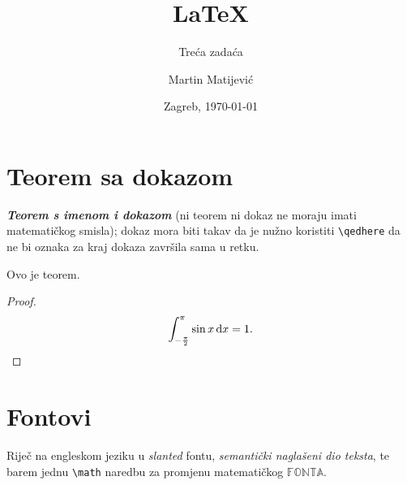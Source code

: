 \documentclass[12pt]{scrartcl}
\newcommand{\BI}[1]{\textbf{\textit{#1}}}
\begin{document}
\title{\Huge\LaTeX}
\subtitle{Treća zadaća}
\author{Martin Matijević}
\date{Zagreb, \today}
\maketitle
\tableofcontents

\section{Teorem sa dokazom}
\BI{Teorem s imenom i dokazom} (ni teorem ni dokaz ne moraju imati matematičkog smisla); dokaz mora biti takav da je nužno koristiti \verb!\qedhere! da ne bi oznaka za kraj dokaza završila sama u retku.
\begin{teorem}
Ovo je teorem.
\end{teorem}
\begin{proof}
\begin{equation*}
\int\nolimits_{-\frac{\pi}{2}}^\pi{\sin x}\,\mathrm{d}x = 1 \text. \qedhere
\end{equation*}
\end{proof}


\section{Fontovi}
Riječ na engleskom jeziku u \textsl{slanted} fontu, \emph{semantički naglašeni dio teksta}, te barem jednu \verb!\math! naredbu za promjenu matematičkog $\mathbb{FONTA}$.
\end{document}
